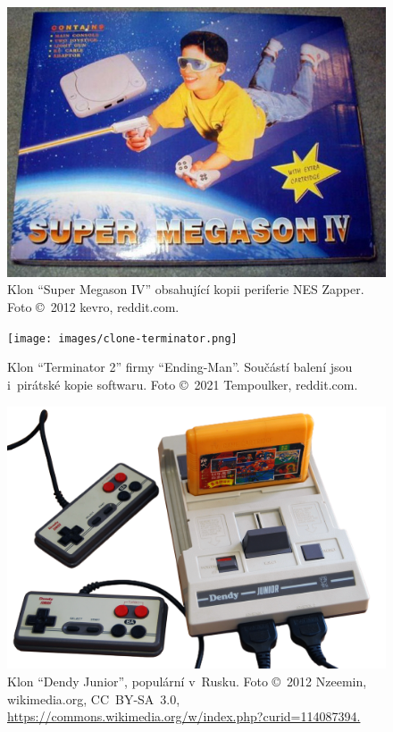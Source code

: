 \begin{figure}[ht!]
	\centering
	\includegraphics[width=0.5\textheight]{images/clone-megason.jpg}
	\caption{Klon \enquote{Super Megason IV} obsahující kopii periferie NES Zapper. Foto \copyright~2012 kevro, reddit.com.}
\end{figure}

\begin{figure}[ht!]
	\centering
	\texttt{[image: images/clone-terminator.png]}
	\caption{Klon \enquote{Terminator 2} firmy \enquote{Ending-Man}. Součástí balení jsou i~pirátské kopie softwaru. Foto \copyright~2021 Tempoulker, reddit.com.}
\end{figure}

\begin{figure}[ht!]
	\centering
	\includegraphics[width=0.5\textheight]{images/clone-dendy.png}
	\caption{Klon \enquote{Dendy Junior}, populární v~Rusku. Foto \copyright~2012 Nzeemin, wikimedia.org, CC~BY-SA~3.0, \url{https://commons.wikimedia.org/w/index.php?curid=114087394.}}
\end{figure}
